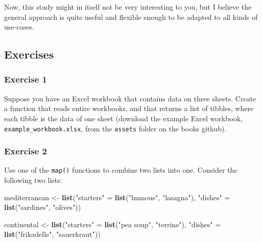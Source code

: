 \documentclass[
]{article}
\newenvironment{Shaded}{\begin{snugshade}}{\end{snugshade}}
\newcommand{\KeywordTok}[1]{\textcolor[rgb]{0.13,0.29,0.53}{\textbf{#1}}}
\newcommand{\NormalTok}[1]{#1}
\newcommand{\StringTok}[1]{\textcolor[rgb]{0.31,0.60,0.02}{#1}}
\begin{document}
Now, this study might in itself not be very interesting to you, but I believe the general approach
is quite useful and flexible enough to be adapted to all kinds of use-cases.

\hypertarget{exercises-6}{%
\subsection{Exercises}\label{exercises-6}}

\hypertarget{exercise-1-6}{%
\subsubsection*{Exercise 1}\label{exercise-1-6}}

Suppose you have an Excel workbook that contains data on three sheets. Create a function that
reads entire workbooks, and that returns a list of tibbles, where each tibble is the data of one
sheet (download the example Excel workbook, \texttt{example\_workbook.xlsx}, from the \texttt{assets} folder on
the books github).

\hypertarget{exercise-2-4}{%
\subsubsection*{Exercise 2}\label{exercise-2-4}}

Use one of the \texttt{map()} functions to combine two lists into one. Consider the following two lists:

\begin{Shaded}
\begin{Highlighting}[]
\NormalTok{mediterranean \textless{}{-}}\StringTok{ }\KeywordTok{list}\NormalTok{(}\StringTok{"starters"}\NormalTok{ =}\StringTok{ }\KeywordTok{list}\NormalTok{(}\StringTok{"humous"}\NormalTok{, }\StringTok{"lasagna"}\NormalTok{), }\StringTok{"dishes"}\NormalTok{ =}\StringTok{ }\KeywordTok{list}\NormalTok{(}\StringTok{"sardines"}\NormalTok{, }\StringTok{"olives"}\NormalTok{))}

\NormalTok{continental \textless{}{-}}\StringTok{ }\KeywordTok{list}\NormalTok{(}\StringTok{"starters"}\NormalTok{ =}\StringTok{ }\KeywordTok{list}\NormalTok{(}\StringTok{"pea soup"}\NormalTok{, }\StringTok{"terrine"}\NormalTok{), }\StringTok{"dishes"}\NormalTok{ =}\StringTok{ }\KeywordTok{list}\NormalTok{(}\StringTok{"frikadelle"}\NormalTok{, }\StringTok{"sauerkraut"}\NormalTok{))}
\end{Highlighting}
\end{Shaded}
\end{document}
